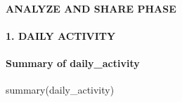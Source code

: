 \documentclass[
]{article}
\newenvironment{Shaded}{\begin{snugshade}}{\end{snugshade}}
\newcommand{\FunctionTok}[1]{\textcolor[rgb]{0.00,0.00,0.00}{#1}}
\newcommand{\NormalTok}[1]{#1}
\begin{document}
\hypertarget{analyze-and-share-phase}{%
\paragraph{ANALYZE AND SHARE PHASE}\label{analyze-and-share-phase}}

\hypertarget{daily-activity}{%
\paragraph{1. DAILY ACTIVITY}\label{daily-activity}}

\hypertarget{summary-of-daily_activity}{%
\paragraph{Summary of daily\_activity}\label{summary-of-daily_activity}}

\begin{Shaded}
\begin{Highlighting}[]
\FunctionTok{summary}\NormalTok{(daily\_activity)}
\end{Highlighting}
\end{Shaded}
\end{document}
